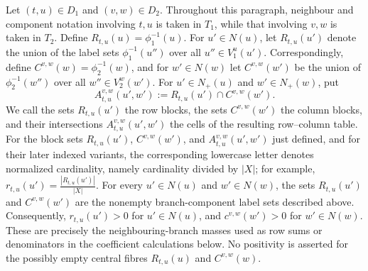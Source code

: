 \documentclass[12pt]{article}
\begin{document}
Let $(t,u)\in D_1$ and $(v,w)\in D_2$.  Throughout this paragraph,
neighbour and component notation involving $t,u$ is taken in $T_1$, while
that involving $v,w$ is taken in $T_2$.  Define
$R_{t,u}(u)=\phi_1^{-1}(u)$.  For $u'\in N(u)$, let $R_{t,u}(u')$
denote the union of the label sets $\phi_1^{-1}(u'')$ over all
$u''\in V_1^u(u')$.  Correspondingly, define
$C^{v,w}(w)=\phi_2^{-1}(w)$, and for $w'\in N(w)$ let
$C^{v,w}(w')$ be the union of $\phi_2^{-1}(w'')$ over all
$w''\in V_2^w(w')$.  For $u'\in N_+(u)$ and $w'\in N_+(w)$, put
\begin{equation}\label{eq:block-cells}
 A_{t,u}^{v,w}(u',w'):=R_{t,u}(u')\cap C^{v,w}(w').
\end{equation}
We call the sets $R_{t,u}(u')$ the row blocks, the sets $C^{v,w}(w')$
the column blocks, and their intersections $A_{t,u}^{v,w}(u',w')$ the
cells of the resulting row--column table.
For the block sets $R_{t,u}(u')$, $C^{v,w}(w')$, and
$A_{t,u}^{v,w}(u',w')$ just defined, and for their later indexed variants,
the corresponding lowercase letter denotes normalized cardinality, namely
cardinality divided by $|X|$; for example,
$r_{t,u}(u')=\frac{|R_{t,u}(u')|}{|X|}$.
For every $u'\in N(u)$ and $w'\in N(w)$, the sets $R_{t,u}(u')$ and
$C^{v,w}(w')$ are the nonempty branch-component label sets described above.
Consequently, $r_{t,u}(u')>0$ for $u'\in N(u)$, and
$c^{v,w}(w')>0$ for $w'\in N(w)$.
These are precisely the neighbouring-branch masses used as row sums or
denominators in the coefficient calculations below.  No positivity is
asserted for the possibly empty central fibres $R_{t,u}(u)$ and
$C^{v,w}(w)$.
\end{document}

